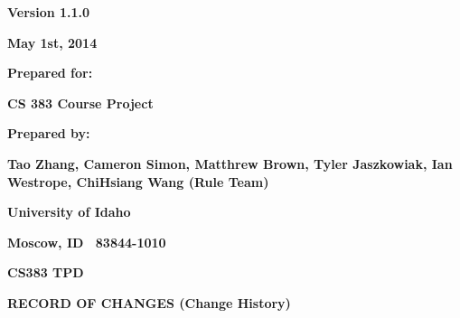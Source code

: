 \bigskip


\bigskip


\bigskip


\bigskip

{\centering{}\bfseries\color{black}
Version 1.1.0
\par}

{\centering{}\bfseries\color{black}
May 1st, 2014
\par}


\bigskip


\bigskip

{\centering{}\bfseries\color{black}
Prepared for:
\par}

{\centering{}\bfseries\color{black}
CS 383 Course Project
\par}


\bigskip


\bigskip

{\centering{}\bfseries\color{black}
Prepared by:
\par}

{\centering{}\bfseries\color{black}
Tao Zhang, Cameron Simon, Matthrew Brown, Tyler Jaszkowiak, Ian Westrope, ChiHsiang Wang (Rule Team)
\par}

{\centering{}\bfseries\color{black}
University of Idaho
\par}

{\centering{}\bfseries\color{black}
Moscow, ID \ 83844-1010
\par}

{\centering{}\bfseries\color{black}
CS383 TPD
\par}

\pagebreak

{\centering{}\bfseries\color{black}
RECORD OF CHANGES (Change History)
\par}


